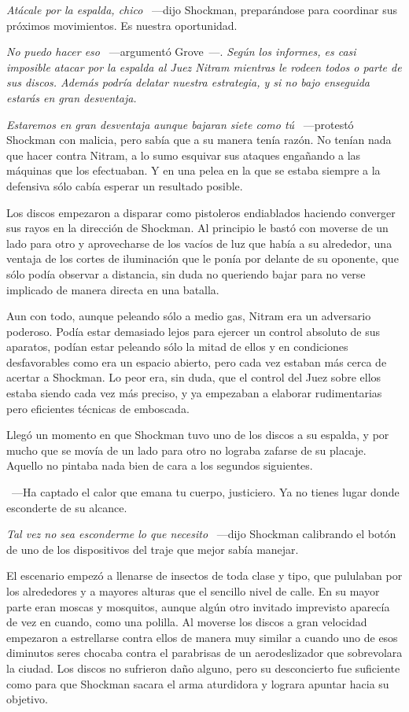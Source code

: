 \emph{Atácale por la espalda, chico} ~---dijo Shockman, preparándose para coordinar sus próximos movimientos. Es nuestra oportunidad.

\emph{No puedo hacer eso} ~---argumentó Grove~---. \emph{Según los informes, es casi imposible atacar por la espalda al Juez Nitram mientras le rodeen todos o parte de sus discos. Además podría delatar nuestra estrategia, y si no bajo enseguida estarás en gran desventaja.}

\emph{Estaremos en gran desventaja aunque bajaran siete como tú} ~---protestó Shockman con malicia, pero sabía que a su manera tenía razón. No tenían nada que hacer contra Nitram, a lo sumo esquivar sus ataques engañando a las máquinas que los efectuaban. Y en una pelea en la que se estaba siempre a la defensiva sólo cabía esperar un resultado posible.

Los discos empezaron a disparar como pistoleros endiablados haciendo converger sus rayos en la dirección de Shockman. Al principio le bastó con moverse de un lado para otro y aprovecharse de los vacíos de luz que había a su alrededor, una ventaja de los cortes de iluminación que le ponía por delante de su oponente, que sólo podía observar a distancia, sin duda no queriendo bajar para no verse implicado de manera directa en una batalla.

Aun con todo, aunque peleando sólo a medio gas, Nitram era un adversario poderoso. Podía estar demasiado lejos para ejercer un control absoluto de sus aparatos, podían estar peleando sólo la mitad de ellos y en condiciones desfavorables como era un espacio abierto, pero cada vez estaban más cerca de acertar a Shockman. Lo peor era, sin duda, que el control del Juez sobre ellos estaba siendo cada vez más preciso, y ya empezaban a elaborar rudimentarias pero eficientes técnicas de emboscada.

Llegó un momento en que Shockman tuvo uno de los discos a su espalda, y por mucho que se movía de un lado para otro no lograba zafarse de su placaje. Aquello no pintaba nada bien de cara a los segundos siguientes.

~---Ha captado el calor que emana tu cuerpo, justiciero. Ya no tienes lugar donde esconderte de su alcance.

\emph{Tal vez no sea esconderme lo que necesito} ~---dijo Shockman calibrando el botón de uno de los dispositivos del traje que mejor sabía manejar.

El escenario empezó a llenarse de insectos de toda clase y tipo, que pululaban por los alrededores y a mayores alturas que el sencillo nivel de calle. En su mayor parte eran moscas y mosquitos, aunque algún otro invitado imprevisto aparecía de vez en cuando, como una polilla. Al moverse los discos a gran velocidad empezaron a estrellarse contra ellos de manera muy similar a cuando uno de esos diminutos seres chocaba contra el parabrisas de un aerodeslizador que sobrevolara la ciudad. Los discos no sufrieron daño alguno, pero su desconcierto fue suficiente como para que Shockman sacara el arma aturdidora y lograra apuntar hacia su objetivo.

